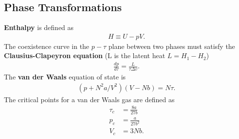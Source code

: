 \begin{multicols}{2}
	\section{Phase Transformations}
	\textbf{Enthalpy} is defined as
	\begin{align}
		H \equiv U - pV.
	\end{align}
	The coexistence curve in the $p-\tau$ plane between two phases must satisfy the \textbf{Clausius-Clapeyron equation} (L is the latent heat $L=H_1-H_2$)
	\begin{align}
		\frac{dp}{d\tau} = \frac{L}{\tau \Delta v}.
	\end{align}
	The \textbf{van der Waals} equation of state is
	\begin{align}
		(p+N^2a/V^2)(V-Nb) = N\tau.
	\end{align}
	The critical points for a van der Waals gas are defined as
	\begin{align}
		\tau_c &= \frac{8a}{27b} \\
		p_c &= \frac{a}{27b^2} \\
		V_c &= 3Nb.
	\end{align}	
\end{multicols}